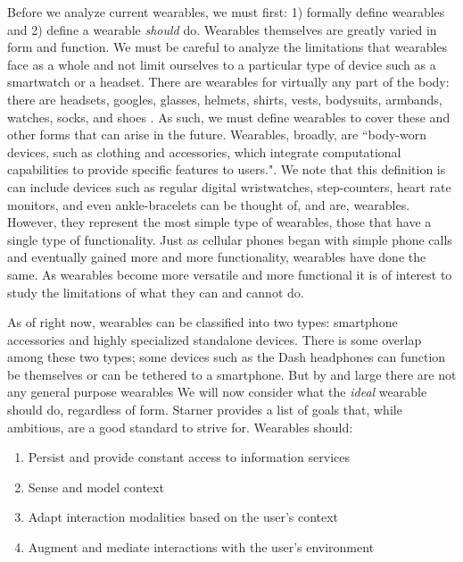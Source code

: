 \documentclass[11pt]{article}
\begin{document}
Before we analyze current wearables, we must first: 1) formally define wearables and 2) define a wearable \textit{should} do.  Wearables themselves are greatly varied in form and function. We must be careful to analyze the limitations that wearables face as a whole and not limit ourselves to a particular type of device such as a smartwatch or a headset. There are wearables for virtually any part of the body: there are headsets, googles, glasses, helmets, shirts, vests, bodysuits, armbands, watches, socks, and shoes \cite{VandricoList}. As such, we must define wearables to cover these and other forms that can arise in the future. Wearables, broadly, are ``body-worn devices, such as clothing and accessories, which integrate computational capabilities to provide specific features to users."\cite{WearableHumanView}. We note that this definition is can include devices such as regular digital wristwatches, step-counters, heart rate monitors, and even ankle-bracelets can be thought of, and are, wearables. However, they represent the most simple type of wearables, those that have a single type of functionality. Just as cellular phones began with simple phone calls and eventually gained more and more functionality, wearables have done the same. As wearables become more versatile and more functional it is of interest to study the limitations of what they can and cannot do. 

As of right now, wearables can be classified into two types: smartphone accessories and highly specialized standalone devices. There is some overlap among these two types; some devices such as the Dash headphones can function be themselves or can be tethered to a smartphone. But by and large there are not any general purpose wearables 
We will now consider what the \textit{ideal} wearable should do, regardless of form. Starner\cite{starnerChallenges1} provides a list of goals that, while ambitious, are a good standard to strive for. Wearables should:
\begin{enumerate}
    \item Persist and provide constant access to information services
    \item Sense and model context
    \item Adapt interaction modalities based on the user's context
    \item Augment and mediate interactions with the user's environment
\end{enumerate}
\end{document}
